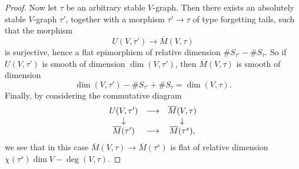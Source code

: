 \documentclass[11pt]{amsart}
\theoremstyle{definition}
\theoremstyle{remark}
\newenvironment{pf}{\begin{proof}}{\end{proof}}
\newcommand{\ol}{\overline}
\newcommand{\ldiag}[1]
       {\makebox[0cm]{\({\scriptstyle#1}\downarrow\phantom{\scriptstyle#1}\)}}
\newcommand{\rdiag}[1]
       {\makebox[0cm]{\(\phantom{\scriptstyle#1}\downarrow{\scriptstyle#1}\)}}
\newcommand{\comdia}[9]{
\begin{array}{ccc}
#1 & \stackrel{#2}{\longrightarrow} & #3 \\
\ldiag{#4} & #5 & \rdiag{#6} \\
#7 & \stackrel{#8}{\longrightarrow} & #9
\end{array}}
\renewcommand{\t}{_{\tau}}
\theoremstyle{plain}
\theoremstyle{definition}
\theoremstyle{remark}
\begin{document}
\begin{pf}
Now let \(\tau\) be an arbitrary stable \(V\)-graph. Then there exists an
absolutely stable \(V\)-graph \(\tau'\), together with
a morphism \(\tau'\rightarrow\tau\) of type forgetting tails, such that the
morphism
\[
U(V,\tau')\longrightarrow\ol{M}(V,\tau)
\]
is surjective, hence a flat epimorphism of relative dimension
\(\#S_{\tau'}-\#S\t\). So if \(U(V,\tau')\) is smooth of
dimension \(\dim(V,\tau')\), then \(\ol{M}(V,\tau)\) is smooth of dimension
\[
\dim(V,\tau')-\#S_{\tau'}+\#S\t=\dim(V,\tau).
\]
Finally, by considering the commutative diagram
\[
\comdia{U(V,\tau')}{}{\ol{M}(V,\tau)}{}{}{
}{\ol{M}(\tau')}{}{\ol{M}(\tau^s),}
\]
we see that in this case \(\ol{M}(V,\tau)\rightarrow\ol{M}(\tau^s)\) is flat of
relative dimension \(\chi(\tau^s)\dim
V-\deg(V,\tau)\).
\end{pf}
\end{document}
